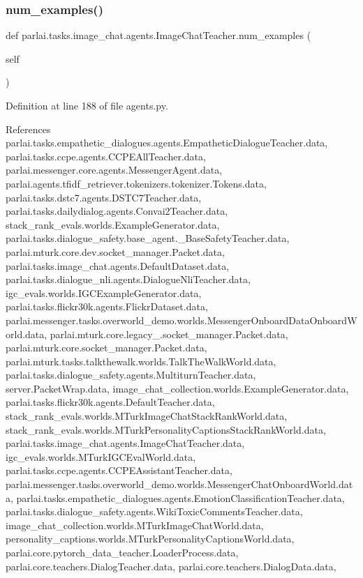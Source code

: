 \subsubsection{\texorpdfstring{num\+\_\+examples()}{num\_examples()}}
{\footnotesize\ttfamily def parlai.\+tasks.\+image\+\_\+chat.\+agents.\+Image\+Chat\+Teacher.\+num\+\_\+examples (\begin{DoxyParamCaption}\item[{}]{self }\end{DoxyParamCaption})}



Definition at line 188 of file agents.\+py.



References parlai.\+tasks.\+empathetic\+\_\+dialogues.\+agents.\+Empathetic\+Dialogue\+Teacher.\+data, parlai.\+tasks.\+ccpe.\+agents.\+C\+C\+P\+E\+All\+Teacher.\+data, parlai.\+messenger.\+core.\+agents.\+Messenger\+Agent.\+data, parlai.\+agents.\+tfidf\+\_\+retriever.\+tokenizers.\+tokenizer.\+Tokens.\+data, parlai.\+tasks.\+dstc7.\+agents.\+D\+S\+T\+C7\+Teacher.\+data, parlai.\+tasks.\+dailydialog.\+agents.\+Convai2\+Teacher.\+data, stack\+\_\+rank\+\_\+evals.\+worlds.\+Example\+Generator.\+data, parlai.\+tasks.\+dialogue\+\_\+safety.\+base\+\_\+agent.\+\_\+\+Base\+Safety\+Teacher.\+data, parlai.\+mturk.\+core.\+dev.\+socket\+\_\+manager.\+Packet.\+data, parlai.\+tasks.\+image\+\_\+chat.\+agents.\+Default\+Dataset.\+data, parlai.\+tasks.\+dialogue\+\_\+nli.\+agents.\+Dialogue\+Nli\+Teacher.\+data, igc\+\_\+evals.\+worlds.\+I\+G\+C\+Example\+Generator.\+data, parlai.\+tasks.\+flickr30k.\+agents.\+Flickr\+Dataset.\+data, parlai.\+messenger.\+tasks.\+overworld\+\_\+demo.\+worlds.\+Messenger\+Onboard\+Data\+Onboard\+World.\+data, parlai.\+mturk.\+core.\+legacy\+\_.\+socket\+\_\+manager.\+Packet.\+data, parlai.\+mturk.\+core.\+socket\+\_\+manager.\+Packet.\+data, parlai.\+mturk.\+tasks.\+talkthewalk.\+worlds.\+Talk\+The\+Walk\+World.\+data, parlai.\+tasks.\+dialogue\+\_\+safety.\+agents.\+Multiturn\+Teacher.\+data, server.\+Packet\+Wrap.\+data, image\+\_\+chat\+\_\+collection.\+worlds.\+Example\+Generator.\+data, parlai.\+tasks.\+flickr30k.\+agents.\+Default\+Teacher.\+data, stack\+\_\+rank\+\_\+evals.\+worlds.\+M\+Turk\+Image\+Chat\+Stack\+Rank\+World.\+data, stack\+\_\+rank\+\_\+evals.\+worlds.\+M\+Turk\+Personality\+Captions\+Stack\+Rank\+World.\+data, parlai.\+tasks.\+image\+\_\+chat.\+agents.\+Image\+Chat\+Teacher.\+data, igc\+\_\+evals.\+worlds.\+M\+Turk\+I\+G\+C\+Eval\+World.\+data, parlai.\+tasks.\+ccpe.\+agents.\+C\+C\+P\+E\+Assistant\+Teacher.\+data, parlai.\+messenger.\+tasks.\+overworld\+\_\+demo.\+worlds.\+Messenger\+Chat\+Onboard\+World.\+data, parlai.\+tasks.\+empathetic\+\_\+dialogues.\+agents.\+Emotion\+Classification\+Teacher.\+data, parlai.\+tasks.\+dialogue\+\_\+safety.\+agents.\+Wiki\+Toxic\+Comments\+Teacher.\+data, image\+\_\+chat\+\_\+collection.\+worlds.\+M\+Turk\+Image\+Chat\+World.\+data, personality\+\_\+captions.\+worlds.\+M\+Turk\+Personality\+Captions\+World.\+data, parlai.\+core.\+pytorch\+\_\+data\+\_\+teacher.\+Loader\+Process.\+data, parlai.\+core.\+teachers.\+Dialog\+Teacher.\+data, parlai.\+core.\+teachers.\+Dialog\+Data.\+data, 